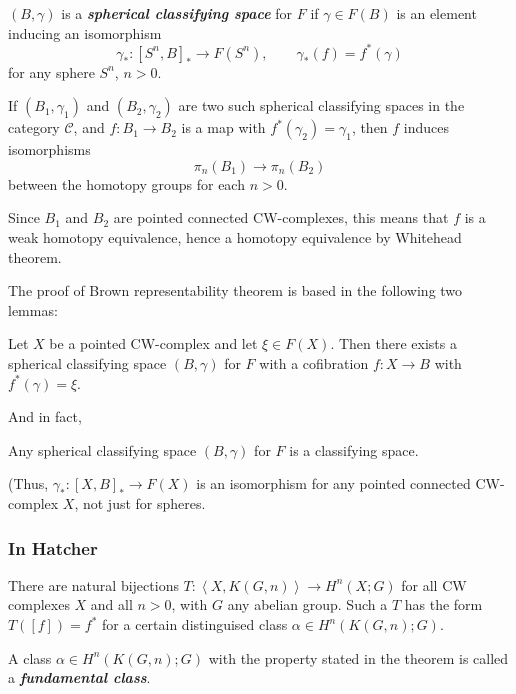 \begin{defn}
	$(B,\gamma)$ is a \textit{\textbf{spherical classifying space}} for $F$ if $\gamma\in F(B)$ is an element inducing an isomorphism
	\[\gamma_{*}:[S^{n},B]_{*}\to F(S^{n}),\qquad \gamma_{*}(f)=f^{*} (\gamma)\]
	for any sphere $S^{n}$, $n>0$.
\end{defn}

\begin{remark}
	If $(B_{1},\gamma_{1})$ and $(B_{2},\gamma_{2})$ are two such spherical classifying spaces in the category $\mathcal{C}$, and $f:B_{1}\to B_{2}$ is a map with $f^{*} (\gamma_{2})=\gamma_{1}$, then $f$ induces isomorphisms
	\[\pi_{n}(B_{1})\to \pi_{n}(B_{2})\]
	between the homotopy groups for each $n>0$.

	Since $B_{1}$ and $B_{2}$ are pointed connected CW-complexes, this means that $f$ is a weak homotopy equivalence, hence a homotopy equivalence by Whitehead theorem.
\end{remark}

The proof of Brown representability theorem is based in the following two lemmas:

\begin{lemma}
	Let $X$ be a pointed CW-complex and let $\xi \in F(X)$. Then there exists a spherical classifying space $(B,\gamma)$ for $F$ with a cofibration  $f:X\to B$ with $f^{*} (\gamma)=\xi$.
\end{lemma}

And in fact,

\begin{lemma}
	Any spherical classifying space $(B,\gamma)$ for $F$ is a classifying space.

	(Thus, $\gamma_{*}:[X,B]_{*}\to F(X)$ is an isomorphism for any pointed connected CW-complex $X$, not just for spheres.
\end{lemma}

\subsubsection*{In Hatcher}

\begin{thm}[4.57]
	There are natural bijections $T:\left<X,K(G,n) \right> \to H^{n}(X;G)$ for all CW complexes $X$ and all $n>0$, with $G$ any abelian group. Such a $T$ has the form $T([f])=f^{*}$ for a certain distinguised class $\alpha\in H^{n}(K(G,n);G)$.
\end{thm}

\begin{defn}
	A class $\alpha\in H^{n}(K(G,n);G)$ with the property stated in the theorem is called a \textit{\textbf{fundamental class}}.
\end{defn}


